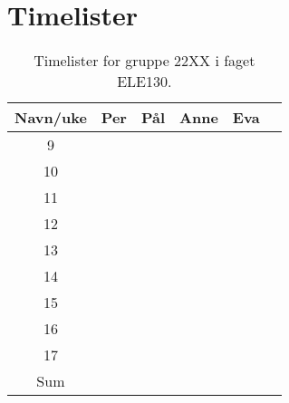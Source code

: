 \documentclass[./main.tex]{subfiles}
\begin{document}
\chapter{Timelister}\label{ch:vedlegg_A}

\begin{table}[H]
    \centering
    \caption{Timelister for gruppe 22XX i faget ELE130.}
    \begin{tabular}{|c|c|c|c|c|c|}\hline
        Navn/uke & Per  & Pål
                 & Anne & Eva      \\\hline\hline
        9        &      &     &  & \\\hline
        10       &      &     &  & \\\hline
        11       &      &     &  & \\\hline
        12       &      &     &  & \\\hline
        13       &      &     &  & \\\hline
        14       &      &     &  & \\\hline
        15       &      &     &  & \\\hline
        16       &      &     &  & \\\hline
        17       &      &     &  & \\\hline\hline
        Sum      &      &     &  & \\\hline
    \end{tabular}
    \label{tab:timeliste}
\end{table}
\end{document}

